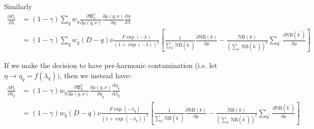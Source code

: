 \documentclass[fleqn,usenatbib]{acmart}
\renewcommand{\d}{\mathrm d}
\renewcommand{\div}[2]{\frac{\d #1}{\d #2} }
\newcommand{\pdiv}[2]{\frac{\partial #1}{\partial #2}}
\begin{document}
				Similarly
				\begin{align*}
					\pdiv{P_k}{\lambda} & = (1-\gamma) \sum_q w_q \pdiv{\mathfrak{B}_k^q}{\mu(q,\nu)} \pdiv{\mu(q,\nu)}{\eta}\div{\eta}{\lambda}
					\\
					& = (1-\gamma) \sum_q w_q (D-q)\nu \frac{F\exp(-\lambda)}{(1 + \exp(-\lambda))^2}\left[ \frac{1}{\sum_{k^\prime} \text{NB}(k^\prime)}  \pdiv{\text{NB}(k)}{\mu} - \frac{\text{NB}(k)}{\left(\sum_{k^\prime} \text{NB}(k^\prime)\right)^2}  \sum_{k^\prime} \pdiv{\text{NB}(k^\prime)}{\mu}\right]
				\end{align*}

				If we make the decision to have per-harmonic contamination (i.e. let $\eta \to \eta_q = f(\lambda_q))$, then we instead have:
				\begin{align*}
					\pdiv{P_k}{\lambda_q} & = (1-\gamma) w_q \pdiv{\mathfrak{B}_k^q}{\mu(q,\nu)} \pdiv{\mu(q,\nu)}{\eta_q}\div{\eta_q}{\lambda_q}
					\\
					& =  (1-\gamma) w_q (D-q)\nu \frac{F\exp(-\lambda_q)}{(1 + \exp(-\lambda_q))^2}\left[ \frac{1}{\sum_{k^\prime} \text{NB}(k^\prime)}  \pdiv{\text{NB}(k)}{\mu} - \frac{\text{NB}(k)}{\left(\sum_{k^\prime} \text{NB}(k^\prime)\right)^2}  \sum_{k^\prime} \pdiv{\text{NB}(k^\prime)}{\mu}\right]
				\end{align*}
\end{document}
